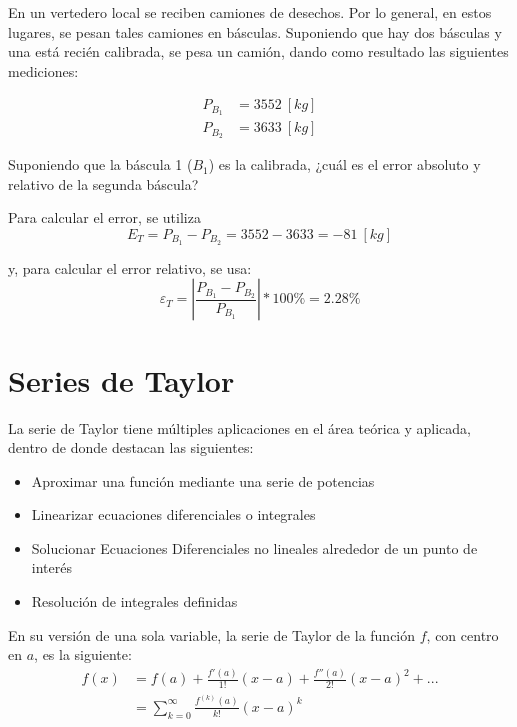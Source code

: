 \begin{ex}

    En un vertedero local se reciben camiones de desechos. Por lo general,
    en estos lugares, se pesan tales camiones en básculas. Suponiendo que
    hay dos básculas y una está recién calibrada, se pesa un camión, dando
    como resultado las siguientes mediciones:

    \begin{eqnarray*}
        P_{B_1} &= 3552\ [\si{kg}] \\
        P_{B_2} &= 3633\ [\si{kg}]
    \end{eqnarray*}

    Suponiendo que la báscula 1 (\(B_1\)) es la calibrada, ¿cuál es el error
    absoluto y relativo de la segunda báscula?

    \begin{solution}
        Para calcular el error, se utiliza
        \[
            E_T = P_{B_1} - P_{B_2} = 3552 - 3633 = -81\ [\si{kg}]
        \]

        \noindent y, para calcular el error relativo, se usa:
        \[
            \boxed{\varepsilon_T = \left| \frac{P_{B_1} - P_{B_2}}{P_{B_1}} \right| * 100\% = 2.28\%}
        \]

    \end{solution}


\end{ex}


\section{Series de Taylor}

La serie de Taylor tiene múltiples aplicaciones en el área teórica y
aplicada, dentro de donde destacan las siguientes:

\begin{itemize}
    \item
        Aproximar una función mediante una serie de potencias
    \item
        Linearizar ecuaciones diferenciales o integrales
    \item
        Solucionar Ecuaciones Diferenciales no lineales alrededor de un punto
        de interés
    \item
        Resolución de integrales definidas
\end{itemize}

\begin{definition}

    En su versión de una sola variable, la serie de Taylor de la función $f$,
    con centro en $a$, es la siguiente:
    \begin{align*}
        f(x) &= f(a) + \frac{f'(a)}{1!}(x - a) + \frac{f''(a)}{2!}(x - a)^2 + ... \\
             &= \sum_{k = 0}^{\infty} \frac{f^{(k)}(a)}{k!}(x - a)^k
    \end{align*}

\end{definition}


